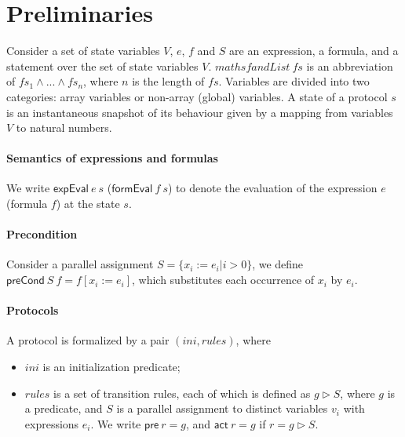 \documentclass{llncs}
\newcommand\lyj[1]{\textcolor{green}{lyj: #1}}
\begin{document}

\section{Preliminaries}
Consider a set of state variables $V$, $e$, $f$ and $S$ are an
expression, a formula, and a statement over the set of state
variables $V$. $mathsf{andList}~fs$  is an abbreviation of
$fs_1\wedge...\wedge fs_n$, where $n$ is the length of $fs$.
Variables are divided into two categories: array variables or
non-array (global) variables. A state of a protocol $s$ is an
instantaneous snapshot of its behaviour given by a mapping from
variables $V$ to natural numbers.




\paragraph*{Semantics of expressions and formulas}  We write
$\mathsf{expEval}~e~s$ ($\mathsf{formEval}~f~s$) to denote the
evaluation of the expression $e$ (formula $f$) at the state $s$. %

\paragraph*{Precondition} Consider a parallel assignment $S=\{x_i:=e_i | i>0\}$,
we define $\mathsf{preCond}~S~f=f[x_i:=e_i]$, which substitutes each
occurrence of $x_i$ by $e_i$.


\paragraph*{Protocols} A protocol is formalized by a pair
$(ini,rules)$, where
%
\begin{itemize}
\item $ini $ is an  initialization predicate;

\item $rules$ is a set of transition rules, each of which is defined as
  $g \vartriangleright  S$, where $g$ is a predicate, and $S$ is a
  parallel assignment to distinct  variables $v_i$ with expressions
  $e_i$. We write $\mathsf{pre}~r=g$, and $\mathsf{act}~r=g$ if $r=g \vartriangleright
  S$.
\end{itemize}
\end{document}
